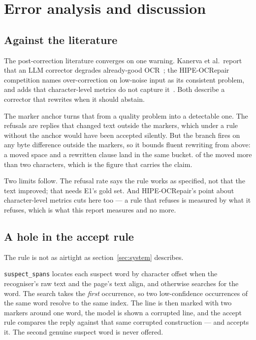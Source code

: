 \section{Error analysis and discussion}
\label{sec:errors}

\subsection{Against the literature}

The post-correction literature converges on one warning. Kanerva et al.\ report
that an LLM corrector degrades already-good OCR~\cite{kanerva2025nofreelunches};
the HIPE-OCRepair competition names over-correction on low-noise input as its
consistent problem, and adds that character-level metrics do not capture
it~\cite{ehrmann2026hipeocrepair}. Both describe a corrector that rewrites when
it should abstain.

The marker anchor turns that from a quality problem into a detectable one. The
\corrRewritesCaught{} refusals are replies that changed text outside the
markers, which under a rule without the anchor would have been accepted
silently. But the branch fires on any byte difference outside the markers, so
it bounds fluent rewriting from above: a moved space and a rewritten clause
land in the same bucket. \corrRewritesSubstantial{} of the
\corrRewritesCaught{} moved more than two characters, which is the figure that
carries the claim.

Two limits follow. The refusal rate says the rule works as specified, not that
the text improved; that needs E1's gold set. And HIPE-OCRepair's point about
character-level metrics cuts here too --- a rule that refuses is measured by
what it refuses, which is what this report measures and no more.

\subsection{A hole in the accept rule}

The rule is not as airtight as section~\ref{sec:system} describes.

\texttt{suspect\_spans} locates each suspect word by character offset when the
recogniser's raw text and the page's text align, and otherwise searches for the
word. The search takes the \emph{first} occurrence, so two low-confidence
occurrences of the same word resolve to the same index. The line is then marked
with two markers around one word, the model is shown a corrupted line, and the
accept rule compares the reply against that same corrupted construction --- and
accepts it. The second genuine suspect word is never offered.


